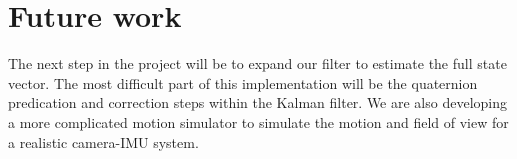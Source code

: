 \documentclass[letterpaper]{article}
\begin{document}
\section{Future work}
The next step in the project will be to expand our filter to estimate
the full state vector. The most difficult part of this implementation
will be the quaternion predication and correction steps within the
Kalman filter. We are also developing a more complicated motion
simulator to simulate the motion and field of view for a realistic
camera-IMU system.




\end{document}
